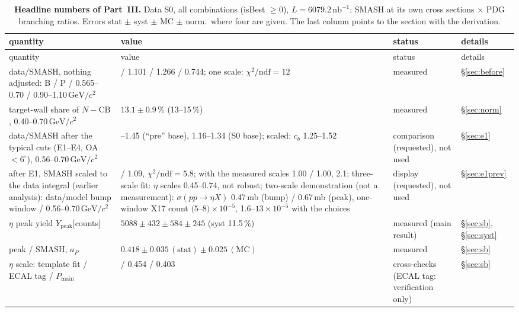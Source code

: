 \documentclass[11pt,a4paper]{article}
\renewcommand{\arraystretch}{1.15}
\newcommand{\nbinv}{\ensuremath{\mathrm{nb}^{-1}}\xspace}
\newcommand{\GeVcc}{\ensuremath{\mathrm{GeV}/c^{2}}\xspace}
\newcommand{\Pmain}{\ensuremath{P_{\mathrm{main}}}\xspace}
\newcommand{\aP}{\ensuremath{a_P}\xspace}
\newcommand{\Ypeak}{\ensuremath{Y_{\mathrm{peak}}}\xspace}
\newcommand{\sigeta}{\ensuremath{\sigma(pp\to\eta X)}\xspace}
\newcommand{\cs}[1]{\textsf{#1}}%
\begin{document}
{\footnotesize
\setlength{\tabcolsep}{3pt}
\renewcommand{\arraystretch}{1.05}
\begin{longtable}{@{}>{\raggedright\arraybackslash}p{4.7cm} >{\raggedright\arraybackslash}p{5.9cm} >{\raggedright\arraybackslash}p{3.4cm} >{\raggedright\arraybackslash}p{\dimexpr\textwidth-14.0cm-6\tabcolsep\relax}@{}}
\caption{\textbf{Headline numbers of Part~III.} Data S0, all combinations (isBest $\ge0$), $L=6079.2\,\nbinv$; SMASH at its own cross
sections $\times$ PDG branching ratios. Errors stat $\pm$ syst $\pm$ MC $\pm$ norm.\ where four are given. The last column points to the
section with the derivation.}\label{tab:summary}\\
\toprule
quantity & value & status & details \\
\midrule
\endfirsthead
\toprule
quantity & value & status & details \\
\midrule
\endhead
\bottomrule
\endfoot
data/SMASH, nothing adjusted: B / P / 0.565--0.70 / 0.90--1.10\,\GeVcc & 0.861 / 1.101 / 1.266 / 0.744; one scale: $\chi^2/\mathrm{ndf}=12$ & measured & \S\ref{sec:before} \\*
target-wall share of $N-\mathrm{CB}$, 0.40--0.70\,\GeVcc & $13.1\pm0.9$\,\% (13--15\,\%) & measured & \S\ref{sec:norm} \\*
data/SMASH after the typical cuts (\cs{E1}--\cs{E4}, OA$<6^\circ$), 0.56--0.70\,\GeVcc & 1.23--1.45 (``pre'' base), 1.16--1.34 (S0 base); scaled: $c_b$ 1.25--1.52 & comparison (requested), not used & \S\ref{sec:e1} \\*
after \cs{E1}, SMASH scaled to the data integral (earlier analysis): data/model bump window / 0.56--0.70\,\GeVcc & 0.81 / 1.09, $\chi^2/\mathrm{ndf}=5.8$; with the measured scales 1.00 / 1.00, 2.1; three-scale fit: $\eta$ scales 0.45--0.74, not robust; two-scale demonstration (not a measurement): \sigeta 0.47\,mb (bump) / 0.67\,mb (peak), one-window X17 count $(5$--$8)\times10^{-5}$, 1.6--$13\times10^{-5}$ with the choices & display (requested), not used & \S\ref{sec:e1prev} \\*
\midrule
$\eta$ peak yield \Ypeak [counts] & $5088\pm432\pm584\pm245$ (syst 11.5\,\%) & measured (main result) & \S\ref{sec:sb}, \S\ref{sec:syst} \\*
peak / SMASH, \aP & $0.418\pm0.035\,(\mathrm{stat})\pm0.025\,(\mathrm{MC})$ & measured & \S\ref{sec:sb} \\
$\eta$ scale: template fit / ECAL tag / \Pmain & 0.382 / 0.454 / 0.403 & cross-checks (ECAL tag: verification only) & \S\ref{sec:sb} \\

\end{longtable}}
\end{document}

